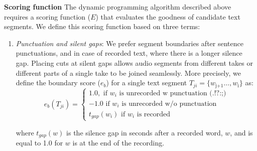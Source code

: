 \textbf{Scoring function}
The dynamic programming algorithm described above requires a
scoring function ($E$) that evaluates the goodness of candidate text segments. We define this scoring function
based on three terms: 
\begin{enumerate}
\item{\textit{Punctuation and silent gaps}: We prefer segment boundaries after sentence punctuations, and in case of recorded text, where there is a longer silence gap. Placing cuts at silent gaps allows audio segments from different takes or different parts of a single take to be joined seamlessly. More precisely, we define the boundary score ($e_b$) for a single text segment $T_{ji} = \{w_\text{j+1}
\dots,w_\text{i}\}$ as:
\begin{equation}
    e_b(T_{ji})= 
\begin{cases}
   1.0, \text{ if } w_i \text{ is unrecorded w punctuation (.!?:;)}\\
   -1.0 \text{ if } w_i \text{ is unrecorded w/o punctuation}\\
   t_{gap}(w_{i}) \text{ if } w_i \text{ is recorded} 
\end{cases}
\end{equation}

where $t_{gap}(w)$ is the silence gap in seconds after a recorded word, $w$, and is equal to 1.0 for $w$ is at the end of the recording. }


\end{enumerate}
